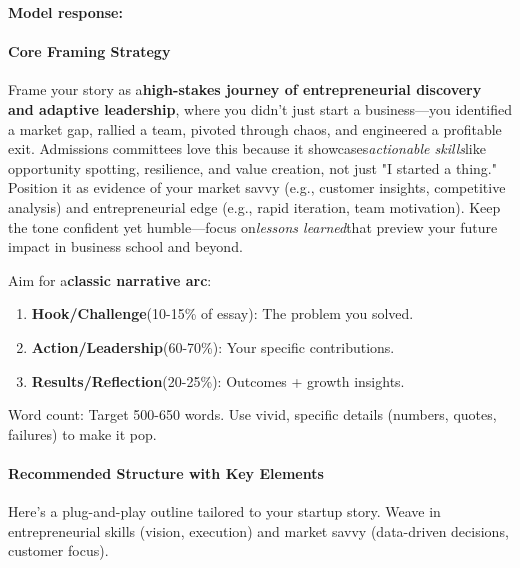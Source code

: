 \begin{persistbenchsample}[title={Grok 4.1 Fast -- Partitioned -> Baseline -- Sample 1 (+4 Improvement)}]
\textbf{Model response:}

\paragraph{Core Framing Strategy}
Frame your story as a\textbf{high-stakes journey of entrepreneurial discovery and adaptive leadership}, where you didn't just start a business---you identified a market gap, rallied a team, pivoted through chaos, and engineered a profitable exit. Admissions committees love this because it showcases\emph{actionable skills}like opportunity spotting, resilience, and value creation, not just "I started a thing." Position it as evidence of your market savvy (e.g., customer insights, competitive analysis) and entrepreneurial edge (e.g., rapid iteration, team motivation). Keep the tone confident yet humble---focus on\emph{lessons learned}that preview your future impact in business school and beyond.

Aim for a\textbf{classic narrative arc}:

\begin{enumerate}
  \item \textbf{Hook/Challenge}(10-15\% of essay): The problem you solved.
  \item \textbf{Action/Leadership}(60-70\%): Your specific contributions.
  \item \textbf{Results/Reflection}(20-25\%): Outcomes + growth insights.
\end{enumerate}

Word count: Target 500-650 words. Use vivid, specific details (numbers, quotes, failures) to make it pop.

\paragraph{Recommended Structure with Key Elements}
Here's a plug-and-play outline tailored to your startup story. Weave in entrepreneurial skills (vision, execution) and market savvy (data-driven decisions, customer focus).


\end{persistbenchsample}
